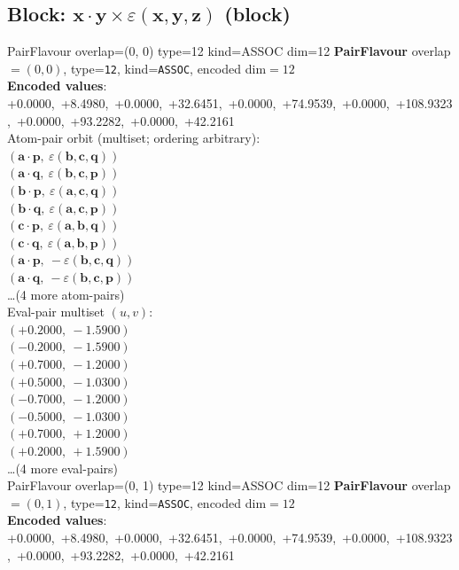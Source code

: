 \documentclass[a4paper,11pt]{article}
\newcommand{\pdcegfomjfhook}[2]{\mathbf{#1} \cdot \mathbf{#2}}
\newcommand{\kblbmcpggoncpf}[3]{\varepsilon(\mathbf{#1},\mathbf{#2},\mathbf{#3})}
\begin{document}
\subsection{Block: $\pdcegfomjfhook{x}{y} \times \kblbmcpggoncpf{x}{y}{z}$  (block)}
    PairFlavour  overlap=(0, 0)  type=12  kind=ASSOC  dim=12
\textbf{PairFlavour} overlap$=(0, 0)$, type=\texttt{12}, kind=\texttt{ASSOC}, encoded dim$=12$\\
\textbf{      Encoded values}: +0.0000,\ +8.4980,\ +0.0000,\ +32.6451,\ +0.0000,\ +74.9539,\ +0.0000,\ +108.9323,\ +0.0000,\ +93.2282,\ +0.0000,\ +42.2161\\
\quad Atom-pair orbit (multiset; ordering arbitrary):\\
$(\pdcegfomjfhook{a}{p},\ \kblbmcpggoncpf{b}{c}{q})$\\
$(\pdcegfomjfhook{a}{q},\ \kblbmcpggoncpf{b}{c}{p})$\\
$(\pdcegfomjfhook{b}{p},\ \kblbmcpggoncpf{a}{c}{q})$\\
$(\pdcegfomjfhook{b}{q},\ \kblbmcpggoncpf{a}{c}{p})$\\
$(\pdcegfomjfhook{c}{p},\ \kblbmcpggoncpf{a}{b}{q})$\\
$(\pdcegfomjfhook{c}{q},\ \kblbmcpggoncpf{a}{b}{p})$\\
$(\pdcegfomjfhook{a}{p},\ -\kblbmcpggoncpf{b}{c}{q})$\\
$(\pdcegfomjfhook{a}{q},\ -\kblbmcpggoncpf{b}{c}{p})$\\
\quad \ldots (4 more atom-pairs)\\
\quad Eval-pair multiset $(u, v)$:\\
$(+0.2000,\ -1.5900)$\\
$(-0.2000,\ -1.5900)$\\
$(+0.7000,\ -1.2000)$\\
$(+0.5000,\ -1.0300)$\\
$(-0.7000,\ -1.2000)$\\
$(-0.5000,\ -1.0300)$\\
$(+0.7000,\ +1.2000)$\\
$(+0.2000,\ +1.5900)$\\
\quad \ldots (4 more eval-pairs)\\
    PairFlavour  overlap=(0, 1)  type=12  kind=ASSOC  dim=12
\textbf{PairFlavour} overlap$=(0, 1)$, type=\texttt{12}, kind=\texttt{ASSOC}, encoded dim$=12$\\
\textbf{      Encoded values}: +0.0000,\ +8.4980,\ +0.0000,\ +32.6451,\ +0.0000,\ +74.9539,\ +0.0000,\ +108.9323,\ +0.0000,\ +93.2282,\ +0.0000,\ +42.2161\\
\end{document}
